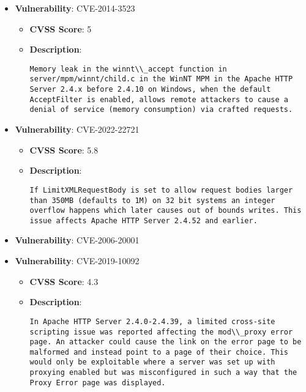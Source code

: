 \documentclass{article}
\begin{document}
\begin{itemize}
        \item \textbf{Vulnerability}: CVE-2014-3523
        \begin{itemize}
            \item \textbf{CVSS Score}:  5 
            \item \textbf{Description}:
            \parbox[t]{0.9\linewidth}{
                \verb|Memory leak in the winnt\\_accept function in server/mpm/winnt/child.c in the WinNT MPM in the Apache HTTP Server 2.4.x before 2.4.10 on Windows, when the default AcceptFilter is enabled, allows remote attackers to cause a denial of service (memory consumption) via crafted requests.|
            }
        \end{itemize}
    
        \item \textbf{Vulnerability}: CVE-2022-22721
        \begin{itemize}
            \item \textbf{CVSS Score}:  5.8 
            \item \textbf{Description}:
            \parbox[t]{0.9\linewidth}{
                \verb|If LimitXMLRequestBody is set to allow request bodies larger than 350MB (defaults to 1M) on 32 bit systems an integer overflow happens which later causes out of bounds writes. This issue affects Apache HTTP Server 2.4.52 and earlier.|
            }
        \end{itemize}
    
        \item \textbf{Vulnerability}: CVE-2006-20001
    
        \item \textbf{Vulnerability}: CVE-2019-10092
        \begin{itemize}
            \item \textbf{CVSS Score}:  4.3 
            \item \textbf{Description}:
            \parbox[t]{0.9\linewidth}{
                \verb|In Apache HTTP Server 2.4.0-2.4.39, a limited cross-site scripting issue was reported affecting the mod\\_proxy error page. An attacker could cause the link on the error page to be malformed and instead point to a page of their choice. This would only be exploitable where a server was set up with proxying enabled but was misconfigured in such a way that the Proxy Error page was displayed.|
            }
        \end{itemize}
    

\end{itemize}
\end{document}
